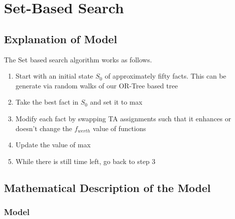 \documentclass{article}
\begin{document}
\section{Set-Based Search}

\subsection{Explanation of Model}

The Set based search algorithm works as follows.

\begin{enumerate}

\item Start with an initial state $S_0$ of approximately fifty facts.
  This can be generate via random walks of our OR-Tree based tree

\item Take the best fact in $S_0$ and set it to max

\item Modify each fact by swapping TA assignments such that it
  enhances or doesn't change the $f_{werth}$ value of functions

\item Update the value of max

\item While there is still time left, go back to step 3


\end{enumerate}

\subsection{Mathematical Description of the Model}

\subsubsection{Model}
\end{document}
